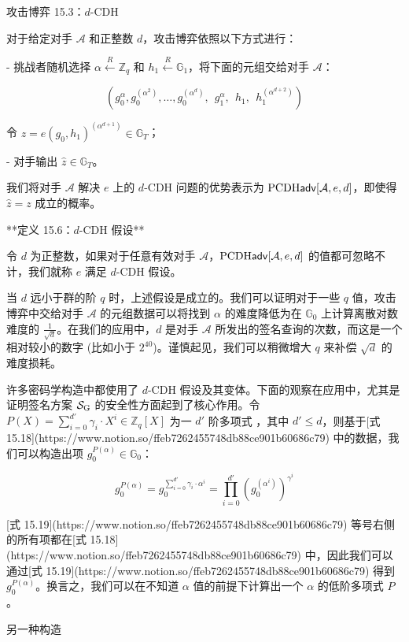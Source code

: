 攻击博弈 15.3：$d$-CDH

对于给定对手 $\mathcal{A}$ 和正整数 $d$，攻击博弈依照以下方式进行：

- 挑战者随机选择 $\alpha \overset{R}\leftarrow \mathbb{Z}_q$ 和 $h_1\overset{R}\leftarrow\mathbb{G}_1$，将下面的元组交给对手 $\mathcal{A}$：
    
    $$
    (
    g_0^\alpha,
    g_0^{(\alpha^2)},
    \dots,
    g_0^{(\alpha^d)},~~
    g_1^\alpha,~~
    h_1,~~
    h_1^{(\alpha^{d+2})}
    )
    $$
    
    令 $z=e(g_0,h_1)^{(\alpha^{d+1})}\in\mathbb{G}_T$；
    
- 对手输出 $\hat{z}\in\mathbb{G}_T$。

我们将对手 $\mathcal{A}$ 解决 $e$ 上的 $d$-CDH 问题的优势表示为 ${\rm PCDH\mathsf{adv}}[\mathcal{A},e,d]$，即使得 $\hat{z}=z$ 成立的概率。

**定义 15.6：$d$-CDH 假设**

令 $d$ 为正整数，如果对于任意有效对手 $\mathcal{A}$，${\rm PCDH\mathsf{adv}}[\mathcal{A},e,d]$ 的值都可忽略不计，我们就称 $e$ 满足 $d$-CDH 假设。

当 $d$ 远小于群的阶 $q$ 时，上述假设是成立的。我们可以证明对于一些 $q$ 值，攻击博弈中交给对手 $\mathcal{A}$ 的元组数据可以将找到 $\alpha$ 的难度降低为在 $\mathbb{G}_0$ 上计算离散对数难度的 $\frac{1}{\sqrt{d}}$。在我们的应用中，$d$ 是对手 $\mathcal{A}$ 所发出的签名查询的次数，而这是一个相对较小的数字 (比如小于 $2^{40}$)。谨慎起见，我们可以稍微增大 $q$ 来补偿 $\sqrt{d}$ 的难度损耗。

许多密码学构造中都使用了 $d$-CDH 假设及其变体。下面的观察在应用中，尤其是证明签名方案 $\mathcal{S}_{\rm G}$ 的安全性方面起到了核心作用。令 $P(X)=\sum_{i=0}^{d'}\gamma_i\cdot X^i\in\mathbb{Z}_q[X]$ 为一 $d'$ 阶多项式 ，其中 $d'\leq d$，则基于[式 15.18](https://www.notion.so/ffeb7262455748db88ce901b60686c79) 中的数据，我们可以构造出项 $g_0^{P(\alpha)}\in\mathbb{G}_0$：

$$
g_0^{P(\alpha)}=g_0^{\sum_{i=0}^{d'}\gamma_i\cdot\alpha^i}=\prod_{i=0}^{d'}(g_0^{(\alpha^i)})^{\gamma^i}
$$

[式 15.19](https://www.notion.so/ffeb7262455748db88ce901b60686c79) 等号右侧的所有项都在[式 15.18](https://www.notion.so/ffeb7262455748db88ce901b60686c79) 中，因此我们可以通过[式 15.19](https://www.notion.so/ffeb7262455748db88ce901b60686c79) 得到 $g_0^{P(\alpha)}$。换言之，我们可以在不知道 $\alpha$ 值的前提下计算出一个 $\alpha$ 的低阶多项式 $P$。

另一种构造

